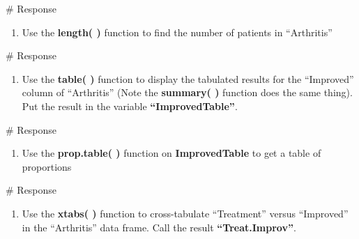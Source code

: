 \documentclass[
  letterpaper,
  DIV=11,
  numbers=noendperiod]{scrreprt}
\newenvironment{Shaded}{\begin{snugshade}}{\end{snugshade}}
\newcommand{\CommentTok}[1]{\textcolor[rgb]{0.37,0.37,0.37}{#1}}
\providecommand{\tightlist}{%
  \setlength{\itemsep}{0pt}\setlength{\parskip}{0pt}}\usepackage{longtable,booktabs,array}
\begin{document}
\begin{Shaded}
\begin{Highlighting}[]
\CommentTok{\# Response}
\end{Highlighting}
\end{Shaded}

\begin{enumerate}
\def\labelenumi{\arabic{enumi}.}
\setcounter{enumi}{9}
\tightlist
\item
  Use the \textbf{length( )} function to find the number of patients in
  ``Arthritis''
\end{enumerate}

\begin{Shaded}
\begin{Highlighting}[]
\CommentTok{\# Response}
\end{Highlighting}
\end{Shaded}

\begin{enumerate}
\def\labelenumi{\arabic{enumi}.}
\setcounter{enumi}{10}
\tightlist
\item
  Use the \textbf{table( )} function to display the tabulated results
  for the ``Improved'' column of ``Arthritis'' (Note the
  \textbf{summary( )} function does the same thing). Put the result in
  the variable \textbf{``ImprovedTable''}.
\end{enumerate}

\begin{Shaded}
\begin{Highlighting}[]
\CommentTok{\# Response}
\end{Highlighting}
\end{Shaded}

\begin{enumerate}
\def\labelenumi{\arabic{enumi}.}
\setcounter{enumi}{11}
\tightlist
\item
  Use the \textbf{prop.table( )} function on \textbf{ImprovedTable} to
  get a table of proportions
\end{enumerate}

\begin{Shaded}
\begin{Highlighting}[]
\CommentTok{\# Response}
\end{Highlighting}
\end{Shaded}

\begin{enumerate}
\def\labelenumi{\arabic{enumi}.}
\setcounter{enumi}{12}
\tightlist
\item
  Use the \textbf{xtabs( )} function to cross-tabulate ``Treatment''
  versus ``Improved'' in the ``Arthritis'' data frame. Call the result
  \textbf{``Treat.Improv''}.
\end{enumerate}
\end{document}

